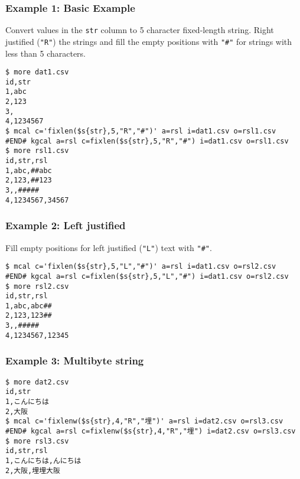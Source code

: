 \subsubsection*{Example 1: Basic Example}

Convert values in the \verb|str| column to 5 character fixed-length string. Right justified (\verb|"R"|) the strings and fill the empty positions with \verb|"#"| for strings with less than 5 characters.


\begin{Verbatim}[baselinestretch=0.7,frame=single]
$ more dat1.csv
id,str
1,abc
2,123
3,
4,1234567
$ mcal c='fixlen($s{str},5,"R","#")' a=rsl i=dat1.csv o=rsl1.csv
#END# kgcal a=rsl c=fixlen($s{str},5,"R","#") i=dat1.csv o=rsl1.csv
$ more rsl1.csv
id,str,rsl
1,abc,##abc
2,123,##123
3,,#####
4,1234567,34567
\end{Verbatim}
\subsubsection*{Example 2: Left justified}

Fill empty positions for left justified (\verb|"L"|) text with \verb|"#"|.


\begin{Verbatim}[baselinestretch=0.7,frame=single]
$ mcal c='fixlen($s{str},5,"L","#")' a=rsl i=dat1.csv o=rsl2.csv
#END# kgcal a=rsl c=fixlen($s{str},5,"L","#") i=dat1.csv o=rsl2.csv
$ more rsl2.csv
id,str,rsl
1,abc,abc##
2,123,123##
3,,#####
4,1234567,12345
\end{Verbatim}
\subsubsection*{Example 3: Multibyte string}



\begin{Verbatim}[baselinestretch=0.7,frame=single]
$ more dat2.csv
id,str
1,こんにちは
2,大阪
$ mcal c='fixlenw($s{str},4,"R","埋")' a=rsl i=dat2.csv o=rsl3.csv
#END# kgcal a=rsl c=fixlenw($s{str},4,"R","埋") i=dat2.csv o=rsl3.csv
$ more rsl3.csv
id,str,rsl
1,こんにちは,んにちは
2,大阪,埋埋大阪
\end{Verbatim}
